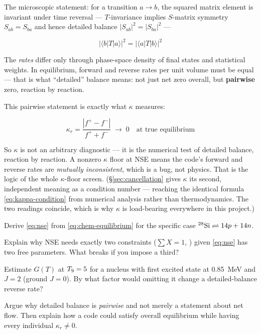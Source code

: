 The microscopic statement: for a transition $a \to b$, the squared matrix
element is invariant under time reversal --- $T$-invariance implies $S$-matrix
symmetry $S_{ab} = S_{ba}$ and hence detailed balance
$|S_{ab}|^2 = |S_{ba}|^2$ \citep{mitchell2010} ---

\begin{equation*}
\bigl|\langle b|T|a\rangle\bigr|^2 = \bigl|\langle a|T|b\rangle\bigr|^2
\end{equation*}

The \emph{rates} differ only through phase-space density of final states and
statistical weights. In equilibrium, forward and reverse rates per unit volume
must be equal --- that is what ``detailed'' balance means: not just net zero
overall, but \textbf{pairwise} zero, reaction by reaction.

This pairwise statement is exactly what $\kappa$ measures:

\begin{equation}
\kappa_r = \frac{|f^+ - f^-|}{f^+ + f^-} \;\longrightarrow\; 0
\quad \text{at true equilibrium}
\label{eq:kappa-detailed-balance}
\end{equation}

So $\kappa$ is not an arbitrary diagnostic --- it is the numerical test of
detailed balance, reaction by reaction. A nonzero $\kappa$ floor at NSE means
the code's forward and reverse rates are \emph{mutually inconsistent}, which is
a bug, not physics. That is the logic of the whole $\kappa$-floor screen.
(\S\ref{sec:cancellation} gives $\kappa$ its second, independent meaning as a
condition number --- reaching the identical formula
\eqref{eq:kappa-condition} from numerical analysis rather than thermodynamics.
The two readings coincide, which is why $\kappa$ is load-bearing everywhere in
this project.)

\begin{selfcheck}
\item Derive \eqref{eq:nse} from \eqref{eq:chem-equilibrium} for the specific
      case $\nuc{Si}{28} \rightleftharpoons 14p + 14n$.
\item Explain why NSE needs exactly two constraints ($\sum X = 1$, \Ye{}) given
      \eqref{eq:nse} has two free parameters. What breaks if you impose a
      third?
\item Estimate $G(T)$ at $\Tn = 5$ for a nucleus with first excited state at
      0.85~MeV and $J = 2$ (ground $J = 0$). By what factor would omitting it
      change a detailed-balance reverse rate?
\item Argue why detailed balance is \emph{pairwise} and not merely a statement
      about net flow. Then explain how a code could satisfy overall equilibrium
      while having every individual $\kappa_r \neq 0$.
\end{selfcheck}

